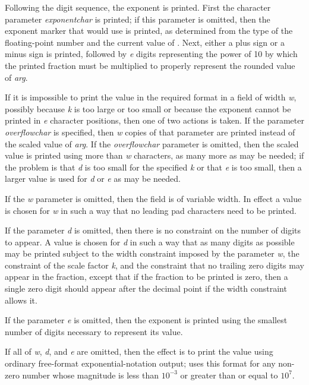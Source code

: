 \begin{flushdesc}
Following the digit sequence, the exponent is printed.
First the character parameter {\it exponentchar} is printed; if this
parameter is omitted, then the exponent marker that
 would use is printed, as determined from the
type of the floating-point number and the current value of
.
Next, either a plus sign or a minus sign
is printed, followed by {\it e} digits representing the power of
10 by which the printed fraction must be multiplied
to properly represent the rounded value of {\it arg}.

If it is impossible to print the value in the required format in a field
of width {\it w}, possibly because {\it k} is too large or too small
or because the exponent cannot be printed in {\it e} character positions,
then one of two actions is taken.  If the
parameter {\it overflowchar} is specified, then {\it w} copies of that
parameter are printed instead of the scaled value of {\it arg}.
If the {\it overflowchar} parameter is omitted, then the scaled value
is printed using more than {\it w} characters, as many more as may be
needed; if the problem is that {\it d} is too small for the specified {\it k}
or that {\it e} is too small, then a larger value is used for {\it d} or {\it e}
as may be needed.

If the {\it w} parameter is omitted, then the field is of variable width.
In effect a value is chosen
for {\it w} in such a way that no leading pad characters need to be printed.

If the parameter {\it d} is omitted, then there is no constraint
on the number of digits to appear.
A value is chosen for {\it d} in such a way that as many digits
as possible may be printed subject to the width constraint
imposed by the parameter {\it w}, the constraint of the scale factor {\it k},
and the constraint that no trailing
zero digits may appear in the fraction, except that if the
fraction to be printed is zero, then a single zero digit should
appear after the decimal point if the width constraint allows it.

If the parameter {\it e} is omitted, then the exponent is printed
using the smallest number of digits necessary to represent its value.

If all of {\it w}, {\it d}, and {\it e} are omitted, then the effect is to print
the value using ordinary free-format exponential-notation output;
 uses this format for any non-zero number whose magnitude
is less than $10^{-3}$ or greater than or equal to $10^7$.


\end{flushdesc}
